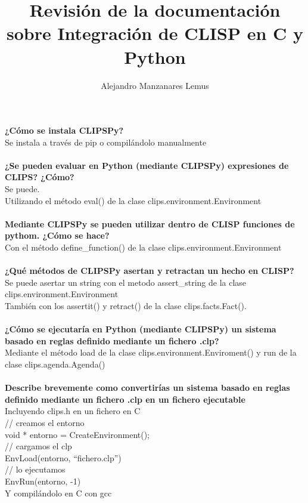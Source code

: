 \documentclass{article}
\title{Revisión de la documentación sobre Integración de CLISP en C y Python}
\author{Alejandro Manzanares Lemus}
\date{}
\begin{document}
\maketitle
\textbf{¿Cómo se instala CLIPSPy?}\\
Se instala a través de pip o compilándolo manualmente
\\\\
\textbf{¿Se pueden evaluar en Python (mediante CLIPSPy) expresiones de CLIPS? ¿Cómo?}\\
Se puede.\\
Utilizando el método eval() de la clase clips.environment.Environment
\\\\
\textbf{Mediante CLIPSPy se pueden utilizar dentro de CLISP funciones de pythom. ¿Cómo se hace?}\\
Con el método define\_function() de la clase clips.environment.Environment
\\\\
\textbf{¿Qué métodos de CLIPSPy asertan y retractan un hecho en CLISP?}\\
Se puede asertar un string con el metodo assert\_string de la clase clips.environment.Environment\\
También con los  assertit() y retract() de la clase clips.facts.Fact().
\\\\
\textbf{¿Cómo se ejecutaría en Python (mediante CLIPSPy) un sistema basado en reglas definido mediante un fichero .clp?}\\
Mediante el método load de la clase clips.environment.Enviroment()  y run de la clase clips.agenda.Agenda()
\\\\
\textbf{Describe brevemente como convertirías un sistema basado en reglas definido mediante un fichero .clp en un fichero ejecutable}\\
Incluyendo clips.h en un fichero en C\\
// creamos el entorno\\
void * entorno = CreateEnvironment();\\
// cargamos el clp\\
EnvLoad(entorno, “fichero.clp”)\\
// lo ejecutamos\\
EnvRun(entorno, -1)\\
Y compilándolo en C con gcc\\
\\\\
\newpage
\end{document}

